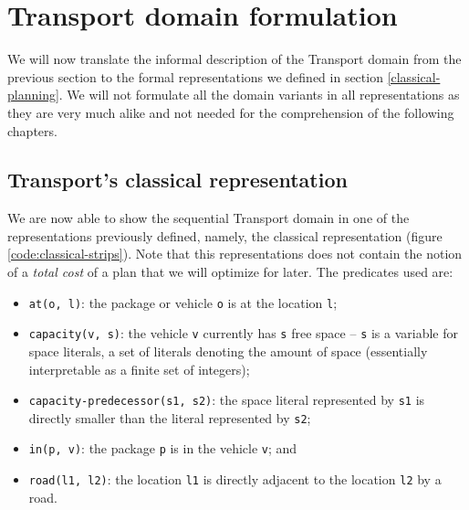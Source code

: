 \section{Transport domain formulation}

We will now translate the informal description of the Transport domain from the previous section to the formal representations we defined in section \ref{classical-planning}. We will not formulate all the domain variants in all representations as
they are very much alike and not needed for the comprehension of the following chapters.

\subsection{Transport's classical representation}\label{transport-classical-representation}

We are now able to show the sequential Transport domain in one of the representations
previously defined, namely,
the classical representation (figure \ref{code:classical-strips}).
Note that this representations does not contain the notion of a \textit{total cost}
of a plan that we will optimize for later.
The predicates used are:

\begin{itemize}
\item \verb+at(o, l)+: the package or vehicle \verb+o+ is at the
location \verb+l+;
\item \verb+capacity(v, s)+: the vehicle \verb+v+ currently has \verb+s+ free space -- \verb+s+ is a variable for space literals, a set of literals denoting the amount of space (essentially interpretable as a finite set of integers);
\item \verb+capacity-predecessor(s1, s2)+: the space literal represented by \verb+s1+
is directly smaller than the literal represented by \verb+s2+;
\item \verb+in(p, v)+: the package \verb+p+ is in the vehicle \verb+v+; and
\item \verb+road(l1, l2)+: the location \verb+l1+ is directly adjacent to the location
\verb+l2+ by a road.
\end{itemize}


